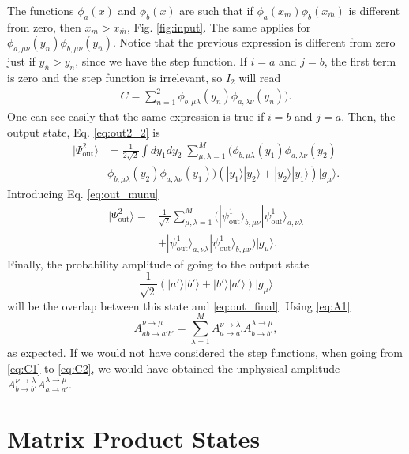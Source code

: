 \documentclass[aps,pra,reprint,amsmath,amssymb]{revtex4-1}
\begin{document}
The functions $\phi_a(x)$ and $\phi_b(x)$ are such that if $\phi_a(x_m)\phi_b(x_{\overline{m}})$ is different from zero, then $x_m>x_{\overline{m}}$, Fig. \ref{fig:input}. The same applies for $\phi_{a,\mu\nu}(y_n)\phi_{b,\mu\nu}(y_{\overline{n}})$. Notice that the previous expression is different from zero just if $y_{\overline{n}}>y_n$, since we have the step function. If $i=a$ and $j=b$, the first term is zero and the step function is irrelevant, so $I_2$ will read
\begin{align}\label{eq:C2}
C=\sum_{n=1}^2\phi_{b,\mu\lambda}(y_n)\phi_{a,\lambda\nu}(y_{\overline{n}})).
\end{align}
One can see easily that the same expression is true if $i=b$ and $j=a$. Then, the output state, Eq. \eqref{eq:out2_2} is
\begin{align}
|\Psi_\text{out}^2\rangle &=\frac{1}{2\sqrt{2}}\int dy_1dy_2\;\sum_{\mu,\lambda=1}^M(\phi_{b,\mu\lambda}(y_1)\phi_{a,\lambda\nu}(y_2)\nonumber\\
+&\phi_{b,\mu\lambda}(y_2)\phi_{a,\lambda\nu}(y_1))(|y_1\rangle|y_2\rangle + |y_2\rangle|y_1\rangle)|g_\mu\rangle.
\end{align}
Introducing Eq. \eqref{eq:out_munu}
\begin{align}\label{eq:out_final}
|\Psi_\text{out}^2\rangle =&\frac{1}{\sqrt{2}}\sum_{\mu,\lambda=1}^M(|\psi_\text{out}^1\rangle_{b,\mu\nu}|\psi_\text{out}^1\rangle_{a,\nu\lambda}  \nonumber\\
& + |\psi_\text{out}^1\rangle_{a,\nu\lambda}|\psi_\text{out}^1\rangle_{b,\mu\nu})|g_\mu\rangle.
\end{align}
Finally, the probability amplitude of going to the output state
\begin{equation}
\frac{1}{\sqrt{2}}(|a'\rangle|b'\rangle+|b'\rangle|a'\rangle)|g_\mu\rangle
\end{equation}
will be the overlap between this state and \eqref{eq:out_final}. Using \eqref{eq:A1}
\begin{equation}
A_{ab\to a'b'}^{\nu\to\mu}=\sum_{\lambda=1}^M A_{a\to a'}^{\nu\to\lambda} A_{b\to b'}^{\lambda\to\mu},
\end{equation}
as expected. If we would not have considered the step functions, when going from \eqref{eq:C1} to \eqref{eq:C2}, we would have obtained the unphysical amplitude $A_{b\to b'}^{\nu\to\lambda} A_{a\to a'}^{\lambda\to\mu}$.

\section{Matrix Product States}
\end{document}
